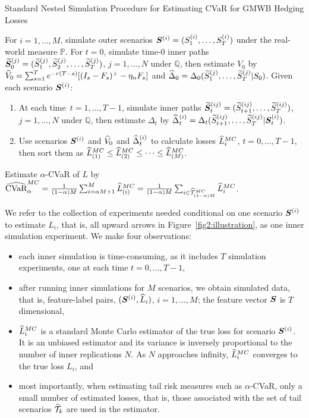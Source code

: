 \begin{algorithm} 
\caption{Standard Nested Simulation Procedure for Estimating CVaR for GMWB Hedging Losses}
\begin{algorithmic}[1] \label{alg2:standardProcedure}
    \STATE  For $i=1,\ldots,M$, simulate outer scenarios $\bm{S}^{(i)} = (S_{1}^{(i)},\ldots,S_{T}^{(i)})$ under the real-world measure $\mathbb{P}$.
    \STATE  For $t=0$, simulate time-$0$ inner paths $\widetilde{\bm{S}}_{0}^{(j)} = (\widetilde{S}_{1}^{(j)},\widetilde{S}_{2}^{(j)},\ldots,\widetilde{S}_{T}^{(j)})$, $j=1,\ldots,N$ under $\mathbb{Q}$, then estimate $V_0$ by $\widehat{V}_0 = \sum_{s=1}^{T} e^{-r(T-s)} [(I_s - F_s)^+- \eta_n F_s]$ and $\widehat{\Delta}_0 = \Delta_0(\widetilde{S}_{1}^{(j)},\ldots,\widetilde{S}_{T}^{(j)} | S_0)$.
    \STATE  Given each scenario $\bm{S}^{(i)}$:
    \begin{enumerate}[label=\alph*., itemsep=0pt, parsep=0pt, topsep=0pt]
        \item   At each time~$t=1,\ldots,T-1$, simulate inner paths $\widetilde{\bm{S}}_{t}^{(ij)} = (\widetilde{S}_{t+1}^{(ij)},\ldots,\widetilde{S}_{T}^{(ij)})$, $j=1,\ldots,N$ under $\mathbb{Q}$, then estimate $\Delta_t$ by $\widehat{\Delta}_t^{(i)} = \Delta_t(\widetilde{S}_{t+1}^{(ij)},\ldots,\widetilde{S}_{T}^{(ij)} | \bm{S}_t^{(i)})$.
        \item   Use scenarios $\bm{S}^{(i)}$ and $\widehat{V}_0$ and $\widehat{\Delta}_t^{(i)}$ to calculate losses $\widehat{L}_i^{MC}$, $t=0,\ldots,T-1$, then sort them as $\widehat{L}^{MC}_{(1)}\leq \widehat{L}^{MC}_{(2)} \leq \cdots\leq \widehat{L}^{MC}_{(M)}$.
    \end{enumerate}
    \STATE  Estimate $\alpha$-CVaR of $L$ by $\widehat{\mbox{CVaR}}^{MC}_\alpha = \frac{1}{(1-\alpha)M} \sum_{i=\alpha M + 1}^{M}\widehat{L}_{(i)}^{MC} = \frac{1}{(1-\alpha)M} \sum_{i \in \widehat{\mathcal{T}}_{(1-\alpha )M}^{MC}}\widehat{L}_{i}^{MC}$.
\end{algorithmic}
\end{algorithm}

We refer to the collection of experiments needed conditional on one scenario $\bm{S}^{(i)}$ to estimate $L_i$, that is, all upward arrows in Figure~\ref{fig2:illustration}, as one inner simulation experiment.
We make four observations:
\begin{itemize}
    \item   each inner simulation is time-consuming, as it includes $T$ simulation experiments, one at each time $t=0,\ldots,T-1$,
    \item   after running inner simulations for $M$ scenarios, we obtain simulated data, that is, feature-label pairs, $(\bm{S}^{(i)}, \widehat{L}_i)$, $i=1,\ldots,M$; the feature vector $\bm{S}$ is $T$ dimensional,
    \item   $\widehat{L}_i^{MC}$ is a standard Monte Carlo estimator of the true loss for scenario $\bm{S}^{(i)}$. It is an unbiased estimator and its variance is inversely proportional to the number of inner replications $N$. 
    As $N$ approaches infinity, $\widehat{L}_i^{MC}$ converges to the true loss $L_i$, and
    \item   most importantly, when estimating tail risk measures such as $\alpha$-CVaR, only a small number of estimated losses, that is, those associated with the set of tail scenarios $\widehat{\mathcal{T}}_{k}$ are used in the estimator.
\end{itemize}

